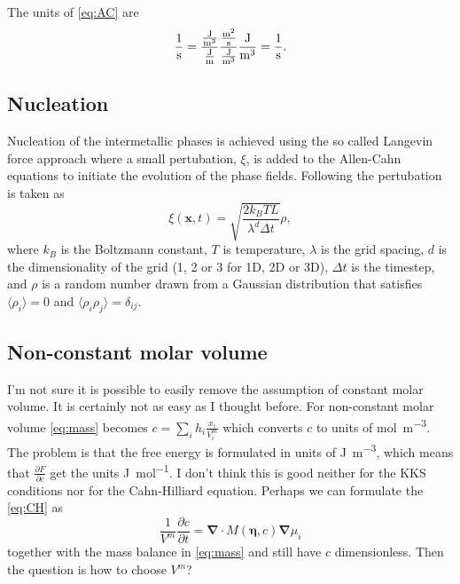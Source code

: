 \documentclass[12pt,a4paper]{article}
\newcommand{\partdiff}[2]{\frac{\partial#1}{\partial#2}}
\providecommand{\vbf}[1]{\boldsymbol{#1}}
\providecommand{\gradient}[0]{\vbf{\nabla}}
\begin{document}
The units of \cref{eq:AC} are
\begin{equation}
\si[per-mode=fraction]{\per\second}=\frac{\si[per-mode=fraction]{\joule\per\cubic\meter}}{\si[per-mode=fraction]{\joule\per\meter}}\frac{\si[per-mode=fraction]{\square\meter\per\second}}{\si[per-mode=fraction]{\joule\per\cubic\meter}}\si[per-mode=fraction]{\joule\per\cubic\meter}=\si[per-mode=fraction]{\per\second}.
\end{equation}
\subsection{Nucleation}\label{sec:nuc}
Nucleation of the intermetallic phases is achieved using the so called Langevin force approach where a small pertubation, $\xi$, is added to the Allen-Cahn equations to initiate the evolution of the phase fields.
Following \cite{shen2007effect} the pertubation is taken as
\begin{equation}
  \xi(\vbf{x},t)=\sqrt{\frac{2k_BTL}{\lambda^d\Delta t}}\rho,
\end{equation}
where $k_B$ is the Boltzmann constant, $T$ is temperature, $\lambda$ is the grid spacing, $d$ is the dimensionality of the grid (1, 2 or 3 for 1D, 2D or 3D), $\Delta t$ is the timestep, and $\rho$ is a random number drawn from a Gaussian distribution that satisfies $\langle\rho_i\rangle=0$ and $\langle\rho_i\rho_j\rangle=\delta_{ij}$. 
\subsection{Non-constant molar volume}
I'm not sure it is possible to easily remove the assumption of constant molar volume.
It is certainly not as easy as I thought before.
For non-constant molar volume \cref{eq:mass} becomes $c=\sum_ih_i\frac{x_i}{V^m_i}$ which converts $c$ to units of \si{\mol\per\cubic\meter}.
The problem is that the free energy is formulated in units of \si{\joule\per\cubic\meter}, which means that $\partdiff{F}{c}$ get the units \si{\joule\per\mole}.
I don't think this is good neither for the KKS conditions nor for the Cahn-Hilliard equation.
Perhaps we can formulate the \cref{eq:CH} as
\begin{equation}
  \frac{1}{V^m}\partdiff{c}{t}=\gradient\cdot M(\vbf{\eta},c)\gradient\mu_i
\end{equation}
together with the mass balance in \cref{eq:mass} and still have $c$ dimensionless.
Then the question is how to choose $V^m$?
\end{document}
